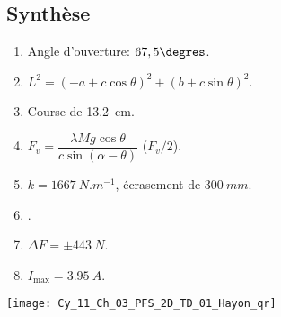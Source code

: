 \subsection*{Synthèse}
%
\ifprof
\else
\footnotesize



\ifprof
\else
\ifcolle
\else
\begin{marginfigure}
\begin{solution}
\begin{enumerate}
\item Angle d'ouverture: $67,5\degres$.
\item $L^2 =\left(-a + c\cos\theta \right)^2 + \left(b + c\sin\theta \right)^2  $.
\item Course de \SI{13,2}{cm}.
\item $   F_v = \dfrac{\lambda Mg\cos \theta}{c\sin \left( \alpha - \theta\right)} $ ($F_v/2$).
\item $k=\SI{1667}{N.m^{-1}}$, écrasement de $\SI{300}{mm}$.
\item .
\item $\Delta F = \pm \SI{443}{N}$.
\item $I_{\text{max}} = \SI{3,95}{A}$.
\end{enumerate}
\end{solution}
\end{marginfigure}
\fi
\fi

\ifprof
\else
\begin{marginfigure}
\centering
\texttt{[image: Cy\_11\_Ch\_03\_PFS\_2D\_TD\_01\_Hayon\_qr]}
\end{marginfigure}
\fi



\fi

\normalsize
